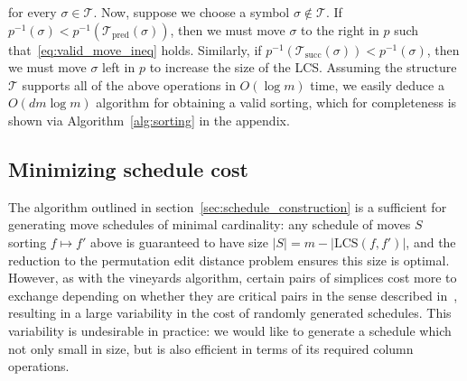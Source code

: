 \documentclass[sn-mathphys]{sn-jnl}
\begin{document}
  for every $\sigma \in \mathcal{T}$. Now, suppose we choose a symbol $\sigma \notin \mathcal{T}$. If $p^{-1}(\sigma) < p^{-1}(\mathcal{T}_{\mathrm{pred}}(\sigma))$, then we must move $\sigma$ to the right in $p$ such that~\eqref{eq:valid_move_ineq} holds. Similarly, if  $p^{-1}(\mathcal{T}_{\mathrm{succ}}(\sigma)) < p^{-1}(\sigma)$, then we must move $\sigma$ left in $p$ to increase the size of the LCS. Assuming the structure $\mathcal{T}$ supports all of the above operations in $O(\log m)$ time, we easily deduce a $O(d m\log m)$ algorithm for obtaining a valid sorting, which for completeness is shown via Algorithm~\ref{alg:sorting} in the appendix. 
 
 
\subsection{Minimizing schedule cost}\label{sec:schedule_cost}
The algorithm outlined in section~\ref{sec:schedule_construction} is a sufficient for generating move schedules of minimal cardinality: any schedule of moves $S$ sorting $f \mapsto f'$ above is guaranteed to have size $\lvert S \rvert = m - \lvert \mathrm{LCS}(f, f') \rvert$, and the reduction to the permutation edit distance problem ensures this size is optimal. 
However, as with the vineyards algorithm, certain pairs of simplices cost more to exchange depending on whether they are critical pairs in the sense described in~\cite{cohen2006vines}, resulting in a large variability in the cost of randomly generated schedules. This variability is undesirable in practice: we would like to generate a schedule which not only small in size, but is also efficient in terms of its required column operations. 
\end{document}
